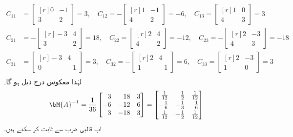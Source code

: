\begin{align*}
C_{11}&=\begin{bmatrix*}[r] 0&-1\\3&2  \end{bmatrix*}=3,\quad C_{12}=-\begin{bmatrix*}[r] 1&-1\\4&2  \end{bmatrix*}=-6,\quad 
C_{13}=\begin{bmatrix*}[r] 1&0\\4&3  \end{bmatrix*}=3\\
C_{21}&=-\begin{bmatrix*}[r] -3&4\\3&2  \end{bmatrix*}=18,\quad C_{22}=\begin{bmatrix*}[r] 2&4\\4&2  \end{bmatrix*}=-12,\quad 
C_{23}=-\begin{bmatrix*}[r] 2&-3\\4&3  \end{bmatrix*}=-18\\
C_{31}&=\begin{bmatrix*}[r] -3&4\\0&-1 \end{bmatrix*}=3,\quad C_{32}=-\begin{bmatrix*}[r] 2&4\\1&-1  \end{bmatrix*}=6,\quad 
C_{33}=\begin{bmatrix*}[r] 2&-3\\1&0  \end{bmatrix*}=3\\
\end{align*}
لہٰذا معکوس درج ذیل ہو گا۔
\begin{align*}
\bM{A}^{-1}=\frac{1}{36}
\begin{bmatrix*}[r]
3&18&3\\-6&-12&6\\3&-18&3
\end{bmatrix*}=
\begin{bmatrix*}[r]
\frac{1}{12}&\frac{1}{2}&\frac{1}{12}\\[0.5ex]
-\frac{1}{6}&-\frac{1}{3}&\frac{1}{6}\\[0.5ex]
\frac{1}{12}&-\frac{1}{2}&\frac{1}{12}
\end{bmatrix*}
\end{align*}
آپ قالبی ضرب سے  ثابت کر سکتے ہیں۔  

